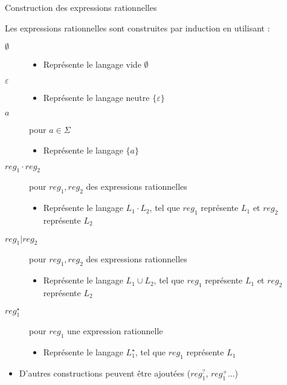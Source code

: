 
\begingroup


\begin{frame}{Construction des expressions rationnelles}

  Les expressions rationnelles sont construites par induction en utilisant :
  \begin{description}
  \item[$\emptyset$]
    \begin{itemize}
    \item Représente le langage vide $\emptyset$
    \end{itemize}
  \item[$\varepsilon$]
    \begin{itemize}
    \item Représente le langage neutre $\{\varepsilon\}$
    \end{itemize}
  \item[$a$] pour $a\in \Sigma$
    \begin{itemize}
    \item Représente le langage $\{a\}$
    \end{itemize}
  \item[$reg_1 \cdot reg_2$] pour $reg_1, reg_2$ des expressions rationnelles
    \begin{itemize}
    \item Représente le langage $L_1 \cdot L_2$, tel que $reg_1$ représente $L_1$ et $reg_2$ représente $L_2$ 
    \end{itemize}
  \item[$reg_1 | reg_2$] pour $reg_1, reg_2$ des expressions rationnelles
    \begin{itemize}
    \item Représente le langage $L_1 \cup L_2$, tel que $reg_1$ représente $L_1$ et $reg_2$ représente $L_2$ 
    \end{itemize}
  \item[$reg_1^\star$] pour $reg_1$ une expression rationnelle
    \begin{itemize}
    \item Représente le langage $L_1^\star$, tel que $reg_1$ représente $L_1$
    \end{itemize}
  \end{description}
    \begin{itemize}
    \item D'autres constructions peuvent être ajoutées ($reg_1^?$, $reg_1^+$...)
    \end{itemize}

\end{frame}


\endgroup
